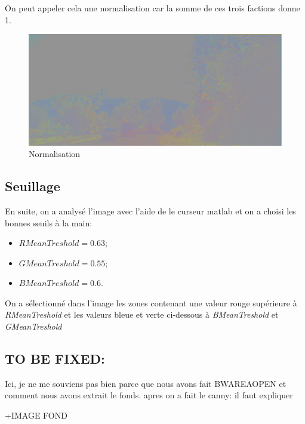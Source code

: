 \documentclass[11pt, french]{article}
\begin{document}
On peut appeler cela une normalisation car la somme de ces trois factions donne 1.\\



\begin{figure}[h]
    \centering
   
        \includegraphics[width=\textwidth]{norma.png}
        \caption{}
        \label{fig:norma}
   
   
    
    
    
    \caption{Normalisation}
\end{figure}

\subsection{Seuillage } 
En suite, on a analysé l'image avec l'aide de le curseur matlab et on a choisi les bonnes seuils à la main:\\
\begin{itemize}
\item $RMeanTreshold = 0.63$;
\item $GMeanTreshold = 0.55$; 
\item $BMeanTreshold = 0.6$.

\end{itemize}
\bigskip
On a sélectionné dans l'image les zones contenant une valeur rouge supérieure à \textit{RMeanTreshold} et les valeurs bleue et verte ci-dessous à \textit{BMeanTreshold} et \textit{GMeanTreshold} 
\subsection{TO BE FIXED: } 


Ici, je ne me souviens pas bien parce que nous avons fait BWAREAOPEN et comment nous avons extrait le fonds.
apres on a fait le canny: il faut expliquer

+IMAGE FOND
\end{document}

